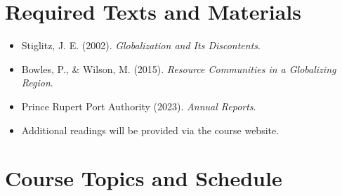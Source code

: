 \documentclass{article}
\begin{document}
\section*{Required Texts and Materials}
\begin{itemize}
    \item Stiglitz, J. E. (2002). \textit{Globalization and Its Discontents}.
    \item Bowles, P., \& Wilson, M. (2015). \textit{Resource Communities in a Globalizing Region}.
    \item Prince Rupert Port Authority (2023). \textit{Annual Reports}.
    \item Additional readings will be provided via the course website.
\end{itemize}

\section*{Course Topics and Schedule}
\end{document}
